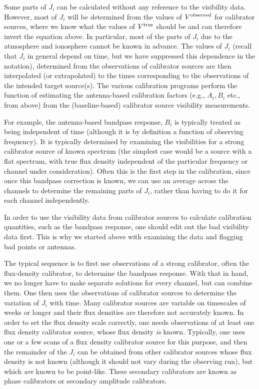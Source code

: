 \documentclass[force,almostfull,justified]{tufte-book}
\begin{document}
Some parts of $J_i$ can be calculated without any reference to the visibility data.  However, most of
$J_i$ will be determined from the values of $V^{\rm observed}$ for calibrator sources, where we know
what the values of $V^{\rm true}$ should be and can therefore invert the equation above.  In
particular, most of the parts of $J_i$ due to the atmosphere and ionosphere cannot be known in
advance.  The values of $J_i$ (recall that $J_i$ in general depend on time, but we have suppressed
this dependence in the notation), determined from the observations of calibrator sources are then
interpolated (or extrapolated) to the times corresponding to the observations of the intended target
source(s). The various calibration programs perform the function of estimating the antenna-based
calibration factors (e.g., $A_i, B_i$ etc., from above) from the (baseline-based) calibrator source
visibility measurements.

For example, the antenna-based bandpass response, $B_i$ is typically treated as being independent of
time (although it is by definition a function of observing frequency).  It is typically determined by
examining the visibilities for a strong calibrator source of known spectrum (the simplest case would
be a source with a flat spectrum, with true flux density independent of the particular frequency or
channel under consideration).  Often this is the first step in the calibration, since once this
bandpass correction is known, we can use an average across the channels to determine the remaining
parts of $J_i$, rather than having to do it for each channel independently.

In order to use the visibility data from calibrator sources to calculate calibration quantities, such
as the bandpass response, one should edit out the bad visibility data first.  This is why we started
above with examining the data and flagging bad points or antennas.

The typical sequence is to first use observations of a strong calibrator, often the flux-density
calibrator, to determine the bandpass response.  With that in hand, we no longer have to make separate
solutions for every channel, but can combine them.  One then uses the observations of calibrator
sources to determine the variation of $J_i$ with time.  Many calibrator sources are variable on
timescales of weeks or longer and their flux densities are therefore not accurately known.  In order
to set the flux density scale correctly, one needs observations of at least one flux density
calibrator source, whose flux density {\em is} known. Typically, one uses one or a few scans of a flux
density calibrator source for this purpose, and then the remainder of the $J_i$ can be obtained from
other calibrator sources whose flux density is not known (although it should not vary during the
observing run), but which {\em are} known to be point-like.  These secondary calibrators are known as
phase calibrators or secondary amplitude calibrators.
\end{document}
